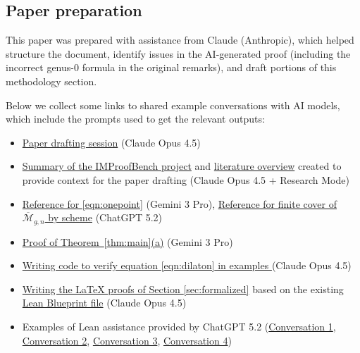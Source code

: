 \documentclass[12pt,reqno]{amsart}
\theoremstyle{definition}
\newcommand{\Mbar}{\overline{\mathcal{M}}}
\begin{document}
\subsection{Paper preparation}
\begin{aiparagraph}
This paper was prepared with assistance from Claude (Anthropic), which helped structure the document, identify issues in the AI-generated proof (including the incorrect genus-0 formula in the original remarks), and draft portions of this methodology section.
\end{aiparagraph}
\begin{humanparagraph}
Below we collect some links to shared example conversations with AI models, which include the prompts used to get the relevant outputs:
\begin{itemize}
    \item \href{https://claude.ai/share/6dd9c266-57d7-4a89-82a4-2fb996c86bef}{Paper drafting session} (Claude Opus 4.5)
    \item \href{https://claude.ai/public/artifacts/213f5978-f358-4865-a8ca-c3ef784e0acb}{Summary of the IMProofBench project} and \href{https://claude.ai/public/artifacts/c822fac4-8908-4c64-b0cc-645c4af6a8dd}{literature overview} created to provide context for the paper drafting (Claude Opus 4.5 + Research Mode)
    \item \href{https://gemini.google.com/share/ab164342674e}{Reference for \eqref{eqn:onepoint}} (Gemini 3 Pro), \href{https://chatgpt.com/share/693fe7a9-7da4-8006-9f21-183f991a7efb}{Reference for finite cover of $\Mbar_{g,n}$ by scheme} (ChatGPT 5.2)
    \item \href{https://gemini.google.com/share/591699ebcecc}{Proof of Theorem~\ref{thm:main}(a)} (Gemini 3 Pro)
    \item \href{https://claude.ai/share/a1fcf89b-6a34-439f-97ea-46666be71c13}{Writing code to verify equation \eqref{eqn:dilaton} in examples } (Claude Opus 4.5)
    \item \href{https://claude.ai/share/475ce24b-1d24-44c1-883d-2dd3ae1181d9}{Writing the LaTeX proofs of Section \ref{sec:formalized}} based on the existing \href{https://schmittj.github.io/balanced-vectors-blueprint/index.html}{Lean Blueprint file} (Claude Opus 4.5)
    \item Examples of Lean assistance provided by ChatGPT 5.2 (\href{https://chatgpt.com/share/694000dd-5618-8006-ab20-924a00bc0e8e}{Conversation 1}, \href{https://chatgpt.com/share/69400106-5118-8006-8b0f-847d6e9c34b8}{Conversation 2}, \href{https://chatgpt.com/share/6940011d-bfa8-8006-8101-683893a60104}{Conversation 3}, \href{https://chatgpt.com/share/69400132-bcac-8006-80ad-72b645ed8185}{Conversation 4})

\end{itemize}
\end{humanparagraph}
\end{document}
